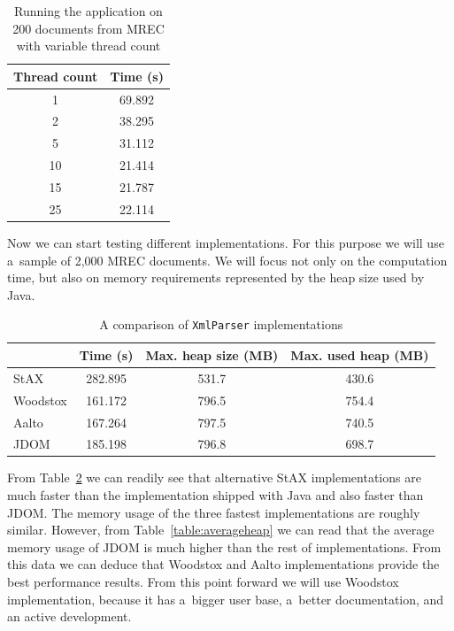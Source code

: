 \documentclass[11pt,oneside,final]{fithesis2}
\def\s#1{#1\index{#1}}
\begin{document}
\begin{table}[!ht]
\centering
\begin{tabular}{|c|c|}
\hline
Thread count & Time (s) \\ \hline
\hline
1 & 69.892 \\ \hline
2 & 38.295 \\ \hline
5 & 31.112 \\ \hline
10 & 21.414 \\ \hline
15 & 21.787 \\ \hline
25 & 22.114 \\ \hline
\end{tabular}
\caption{Running the application on 200 documents from MREC with variable thread count}
\label{table:threadcount}
\end{table}

Now we can start testing different implementations. For this purpose we will use a~sample of 2,000 \s{MREC} documents. We will focus not only on the computation time, but also on memory requirements represented by the heap size used by Java.

\begin{table}[!ht]
\centering
\begin{tabular}{|l|c|c|c|}
\hline
& Time (s) & Max. heap size (MB) & Max. used heap (MB) \\ \hline
\hline
StAX & 282.895 & 531.7 & 430.6 \\ \hline
Woodstox & 161.172 & 796.5 & 754.4 \\ \hline
Aalto & 167.264 & 797.5 & 740.5 \\ \hline
JDOM & 185.198 & 796.8 & 698.7 \\ \hline
\end{tabular}
\caption{A comparison of \texttt{XmlParser} implementations}
\label{table:comparison}
\end{table}

From Table~\ref{table:comparison} we can readily see that alternative StAX implementations are much faster than the implementation shipped with Java and also faster than JDOM. The memory usage of the three fastest implementations are roughly similar. However, from Table~\ref{table:averageheap} we can read that the average memory usage of JDOM is much higher than the rest of implementations. From this data we can deduce that Woodstox and Aalto implementations provide the best performance results. From this point forward we will use Woodstox implementation, because it has a~bigger user base, a~better documentation, and an active development.
\end{document}
